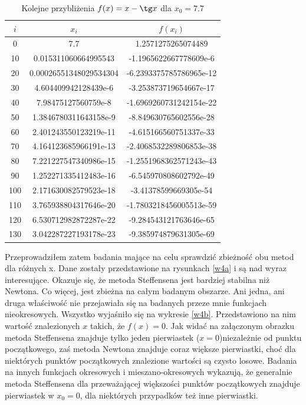 \documentclass{article}
\begin{document}
\begin{table}[p]
    \centering
    \begin{tabular}{|c|c|c|} 
    \hline
    	$i$ &$x_i$&$f(x_i)$\\\hline
0 & 7.7 & 1.2571275265074489 \\
10 & 0.015311060664995543 & -1.1965622667778609e-6 \\
20 & 0.00026551348029534304 & -6.2393375785786965e-12 \\
30 & 4.604409942128439e-6 & -3.253873719654667e-17 \\
40 & 7.98475127560759e-8 & -1.6969260731242154e-22 \\
50 & 1.3846780311643158e-9 & -8.849630765602556e-28 \\
60 & 2.401243550123219e-11 & -4.615166560751337e-33 \\
70 & 4.164123685966191e-13 & -2.4068532289806853e-38 \\
80 & 7.221227547340986e-15 & -1.2551968362571243e-43 \\
90 & 1.252271335412483e-16 & -6.545970808602792e-49 \\
100 & 2.171630082579523e-18 & -3.41378599669305e-54 \\
110 & 3.765938804317646e-20 & -1.7803218456005513e-59 \\
120 & 6.530712982872287e-22 & -9.284543121763646e-65 \\
130 & 3.042287227193178e-23 & -9.385974879631305e-69 \\
 		\hline
    \end{tabular}
    \caption{Kolejne przybliżenia $f(x)=x-\tg x$ dla $x_0=7.7$}
	\label{t3}
\end{table}



Przeprowadziłem zatem badania mające na celu sprawdzić zbieżność obu metod dla różnych x. Dane zostały przedstawione na rysunkach \ref{w4a} i są nad wyraz interesujące. Okazuje się, że metoda Steffensena jest bardziej stabilna niż Newtona. Co więcej, jest zbieżna na całym badanym obszarze. Ani jedna, ani druga właściwość nie przejawiała się na badanych przeze mnie funkcjach nieokresowych. Wszystko wyjaśniło się na wykresie \ref{w4b}. Przedstawiono na nim wartość znalezionych $x$ takich, że $f(x)=0$. Jak widać na załączonym obrazku metoda Steffensena znajduje tylko jeden pierwiastek ($x=0$)niezależnie od punktu początkowego, zaś metoda Newtona znajduje coraz większe pierwiastki, choć dla niektórych punktów początkowych znalezione wartości są czysto losowe. Badania na innych funkcjach okresowych i mieszano-okresowych wykazują, że generalnie metoda Steffensena dla przeważającej większości punktów początkowych znajduje pierwiastek w $x_0=0$, dla niektórych przypadków też inne pierwiastki.
\end{document}
